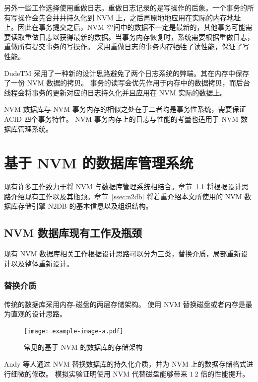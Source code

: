 另外一些工作选择使用重做日志\cite{volos_mnemosyne_2011, giles_softwrap_2015}。重做日志记录的是写操作的后象。一个事务的所有写操作会先合并并持久化到 NVM 上，之后再原地地应用在实际的内存地址上。因此在事务提交之后，NVM 空间中的数据不一定是最新的，其他事务可能需要读取重做日志以获得最新的数据。当事务内存恢复时，系统需要根据重做日志，重做所有提交事务的写操作。
采用重做日志的事务内存牺牲了读性能，保证了写性能。

DudeTM 采用了一种新的设计思路避免了两个日志系统的弊端\cite{liu_dudetm_2017}。其在内存中保存了一份 NVM 数据的拷贝。
事务的读写会优先作用于内存中的数据拷贝，而后台线程会将事务的更新对应的日志持久化并且应用在 NVM 实际的数据上。

NVM 数据库与 NVM 事务内存的相似之处在于二者均是事务性系统，需要保证 ACID 四个事务特性。
NVM 事务内存上的日志与性能的考量也适用于 NVM 数据库管理系统。

\section{基于 NVM 的数据库管理系统}

现有许多工作致力于将 NVM 与数据库管理系统相结合。章节~\ref{ssec:nvmdb} 将根据设计思路介绍现有工作以及其瓶颈。章节~\ref{ssec:n2db} 将着重介绍本文所使用的 NVM 数据库存储引擎 N2DB 的基本信息以及组织结构。

\subsection{NVM 数据库现有工作及瓶颈}
\label{ssec:nvmdb}

现有 NVM 数据库相关工作根据设计思路可以分为三类，替换介质，局部重新设计以及整体重新设计。

\subsubsection{替换介质}

传统的数据库采用内存-磁盘的两层存储架构。
使用 NVM 替换磁盘或者内存是最为直观的设计思路。

\begin{figure}
    \centering
    \texttt{[image: example-image-a.pdf]}
    \caption{常见的基于 NVM 的数据库的存储架构}
    \label{fig:nvm-structure}
\end{figure}

Andy 等人通过 NVM 替换数据库的持久化介质，并为 NVM 上的数据存储格式进行细微的修改\cite{arulraj_lets_2015}。
模拟实验证明使用 NVM 代替磁盘能够带来 $1~2$ 倍的性能提升。

